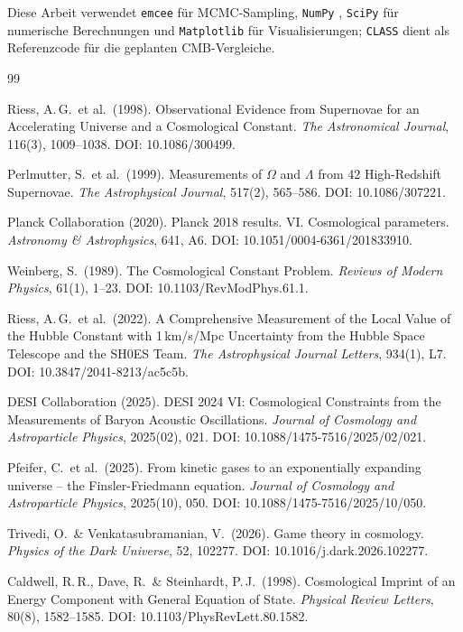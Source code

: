 \documentclass[aps,prd,twocolumn,superscriptaddress,nofootinbib]{revtex4-2}
\begin{document}
Diese Arbeit verwendet \texttt{emcee} \cite{ForemanMackey2013} f\"ur MCMC-Sampling, \texttt{NumPy} \cite{Harris2020}, \texttt{SciPy} \cite{Virtanen2020} f\"ur numerische Berechnungen und \texttt{Matplotlib} \cite{Hunter2007} f\"ur Visualisierungen; \texttt{CLASS} \cite{Blas2011} dient als Referenzcode f\"ur die geplanten CMB-Vergleiche.

\begin{thebibliography}{99}

Riess, A.\,G.\ et al.\ (1998).
Observational Evidence from Supernovae for an Accelerating Universe and a Cosmological Constant.
\textit{The Astronomical Journal}, 116(3), 1009--1038.
DOI: 10.1086/300499.

Perlmutter, S.\ et al.\ (1999).
Measurements of $\Omega$ and $\Lambda$ from 42 High-Redshift Supernovae.
\textit{The Astrophysical Journal}, 517(2), 565--586.
DOI: 10.1086/307221.

Planck Collaboration (2020).
Planck 2018 results. VI. Cosmological parameters.
\textit{Astronomy \& Astrophysics}, 641, A6.
DOI: 10.1051/0004-6361/201833910.

Weinberg, S.\ (1989).
The Cosmological Constant Problem.
\textit{Reviews of Modern Physics}, 61(1), 1--23.
DOI: 10.1103/RevModPhys.61.1.

Riess, A.\,G.\ et al.\ (2022).
A Comprehensive Measurement of the Local Value of the Hubble Constant with 1\,km/s/Mpc Uncertainty from the Hubble Space Telescope and the SH0ES Team.
\textit{The Astrophysical Journal Letters}, 934(1), L7.
DOI: 10.3847/2041-8213/ac5c5b.

DESI Collaboration (2025).
DESI 2024 VI: Cosmological Constraints from the Measurements of Baryon Acoustic Oscillations.
\textit{Journal of Cosmology and Astroparticle Physics}, 2025(02), 021.
DOI: 10.1088/1475-7516/2025/02/021.

Pfeifer, C.\ et al.\ (2025).
From kinetic gases to an exponentially expanding universe -- the Finsler-Friedmann equation.
\textit{Journal of Cosmology and Astroparticle Physics}, 2025(10), 050.
DOI: 10.1088/1475-7516/2025/10/050.

Trivedi, O.\ \& Venkatasubramanian, V.\ (2026).
Game theory in cosmology.
\textit{Physics of the Dark Universe}, 52, 102277.
DOI: 10.1016/j.dark.2026.102277.

Caldwell, R.\,R., Dave, R.\ \& Steinhardt, P.\,J.\ (1998).
Cosmological Imprint of an Energy Component with General Equation of State.
\textit{Physical Review Letters}, 80(8), 1582--1585.
DOI: 10.1103/PhysRevLett.80.1582.


\end{thebibliography}
\end{document}
